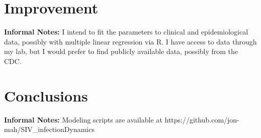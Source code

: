 \documentclass[11pt]{article}
\begin{document}
\section*{Improvement}

\textbf{Informal Notes: }I intend to fit the parameters to clinical and epidemiological data, possibly with multiple linear regression via R. I have access to data through my lab, but I would prefer to find publicly available data, possibly from the CDC.

\section*{Conclusions}

\textbf{Informal Notes: }Modeling scripts are available at https://github.com/jon-mah/SIV\_infectionDynamics

\bigskip



\end{document}
